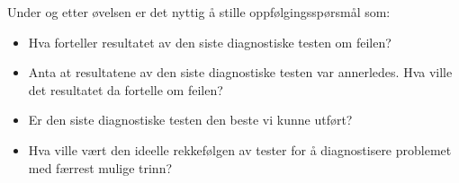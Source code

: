 Under og etter øvelsen er det nyttig å stille oppfølgingsspørsmål som:

\begin{itemize}
\item{} Hva forteller resultatet av den siste diagnostiske testen om feilen?
\item{} Anta at resultatene av den siste diagnostiske testen var annerledes. Hva ville det resultatet da fortelle om feilen?
\item{} Er den siste diagnostiske testen den beste vi kunne utført?
\item{} Hva ville vært den ideelle rekkefølgen av tester for å diagnostisere problemet med færrest mulige trinn?
\end{itemize}




